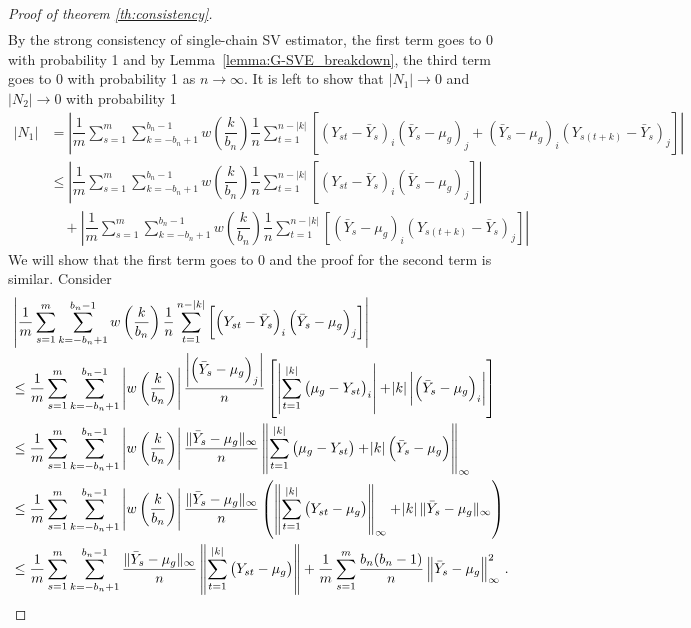 \documentclass[11pt]{article}
\theoremstyle{remark}
\begin{document}
\begin{proof}[Proof of theorem \ref{th:consistency}]
\begin{align*}
\end{align*}
%
By the strong consistency of single-chain SV estimator, the first term goes to 0 with probability 1 and by Lemma~\ref{lemma:G-SVE_breakdown}, the third term goes to 0 with probability 1 as $n \to \infty$. It is left to show that $|N_1| \to 0$ and $|N_2| \to 0$ with probability 1
%
\begin{align*}
|N_1| & = \left|\dfrac{1}{m}\sum_{s=1}^{m}  \sum_{k=-b_n+1}^{b_n-1}  w\left(\dfrac{k}{b_n}\right)\dfrac{1}{n}  \sum_{t=1}^{n-|k|}  \left[ \left(Y_{st} - \bar{Y}_s \right)_i  \left(\bar{Y}_s - \mu_g \right)_j + \left(\bar{Y}_s - \mu_g \right)_i  \left(Y_{s(t+k)} - \bar{Y}_s \right)_j\right] \right|\\
& \leq \left| \dfrac{1}{m}\sum_{s=1}^{m}\sum_{k=-b_n+1}^{b_n-1}w\left(\dfrac{k}{b_n}\right)\dfrac{1}{n}\sum_{t=1}^{n-|k|}\left[ \left(Y_{st} - \bar{Y}_s \right)_i  \left(\bar{Y}_s - \mu_g \right)_j \right] \right| \\ 
& \quad + \left| \dfrac{1}{m}\sum_{s=1}^{m}\sum_{k=-b_n+1}^{b_n-1}w\left(\dfrac{k}{b_n}\right)\dfrac{1}{n}\sum_{t=1}^{n-|k|}\left[ \left(\bar{Y}_s - \mu_g \right)_i  \left(Y_{s(t+k)} - \bar{Y}_s \right)_j\right] \right|
\end{align*}
%
We will show that the first term goes to 0 and the proof for the second term is similar. Consider
\begin{align*}
    & \left| \dfrac{1}{m}\sum_{s=1}^{m}\sum_{k=-b_n+1}^{b_n-1}w\left(\dfrac{k}{b_n}\right)\dfrac{1}{n}\sum_{t=1}^{n-|k|}\left[ \left(Y_{st} - \bar{Y}_s \right)_i  \left(\bar{Y}_s - \mu_g \right)_j \right] \right| \\
    & \leq \dfrac{1}{m}\sum_{s=1}^{m}\sum_{k=-b_n+1}^{b_n-1} \left| w\left(\dfrac{k}{b_n}\right) \right| \dfrac{ \left|  \left(\bar{Y}_s - \mu_g \right)_j \right| }{n} \left[ \left|\sum_{t=1}^{|k|} \left(\mu_g - Y_{st} \right)_i \right| + \abs{k} \left|\left(\bar{Y}_s - \mu_g \right)_i \right|\right]\\
    & \leq \dfrac{1}{m}\sum_{s=1}^{m}\sum_{k=-b_n+1}^{b_n-1}  \left|w\left(\dfrac{k}{b_n}\right) \right|\dfrac{\|\bar{Y}_s - \mu_g\|_{\infty}}{n} \left\|\sum_{t=1}^{|k|} \left(\mu_g - Y_{st} \right) + \abs{k} \left(\bar{Y}_s - \mu_g \right)\right\|_{\infty}\\
    & \leq \dfrac{1}{m}\sum_{s=1}^{m}\sum_{k=-b_n+1}^{b_n-1} \left|w\left(\dfrac{k}{b_n}\right) \right|\dfrac{\|\bar{Y}_s - \mu_g\|_{\infty}}{n} \left(\left\|\sum_{t=1}^{|k|}  \left(Y_{st} - \mu_g \right)\right\|_{\infty} + \abs{k}\|\bar{Y}_s - \mu_g\|_{\infty} \right)\\
    & \leq \dfrac{1}{m}\sum_{s=1}^{m}\sum_{k=-b_n+1}^{b_n-1}\dfrac{\|\bar{Y}_s - \mu_g\|_{\infty}}{n} \left\|\sum_{t=1}^{|k|} \left(Y_{st} - \mu_g\right) \right\| + \dfrac{1}{m}\sum\limits_{s=1}^{m} \dfrac{b_n(b_n-1)}{n} \left \|\bar{Y}_s - \mu_g \right \|_{\infty}^2\,.
\end{align*}


\end{proof}
\end{document}
